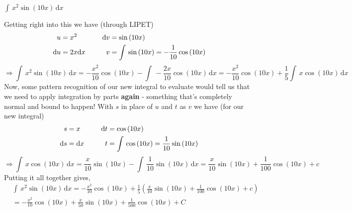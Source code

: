 \documentclass[addpoints]{exam}
\theoremstyle{definition}
\theoremstyle{plain}
\begin{document}
\begin{questions}
    \ifprintanswers
    \else
        \newpage
    \fi

    \question $\displaystyle \int\,x^{2}\sin\left(10x\right)\,\mathrm{d}x$
    \begin{solution}[\stretch{1}]
        Getting right into this we have (through LIPET)
        \begin{align*}
            u &= x^2 &\hspace{0.2in} \mathrm{d}v &= \sin\left(10x\right) \\
            \mathrm{d}u &= 2x\mathrm{d}x &\hspace{0.2in} v &= \int\,\sin\left(10x\right) = -\frac{1}{10}\cos\left(10x\right)
        \end{align*}
        \[
            \Rightarrow \int\,x^2\sin\left(10x\right)\,\mathrm{d}x = -\frac{x^2}{10}\cos\left(10x\right) - \int\,-\frac{2x}{10}\cos\left(10x\right)\,\mathrm{d}x = -\frac{x^2}{10}\cos\left(10x\right) + \frac{1}{5}\int\,x\cos\left(10x\right)\,\mathrm{d}x
        \]
        Now, some pattern recognition of our new integral to evaluate would tell us that we need to apply integration by parts \textbf{again} - something that's completely normal and bound to happen! With $s$ in place of $u$ and $t$ as $v$ we have (for our new integral)
        \begin{align*}
            s &= x &\hspace{0.2in} \mathrm{d}t &= \cos\left(10x\right) \\
            \mathrm{d}s &= \mathrm{d}x &\hspace{0.2in} t &= \int\,\cos\left(10x\right) = \frac{1}{10}\sin\left(10x\right)
        \end{align*}
        \[
            \Rightarrow \int\,x\cos\left(10x\right)\,\mathrm{d}x = \frac{x}{10}\sin\left(10x\right) - \int\,\frac{1}{10}\sin\left(10x\right)\,\mathrm{d}x = \frac{x}{10}\sin\left(10x\right) + \frac{1}{100}\cos\left(10x\right) + c
        \]
        Putting it all together gives,
        \begin{align*}
        &\int\,x^{2}\sin\left(10x\right)\,\mathrm{d}x = -\frac{x^2}{10}\cos\left(10x\right) + \frac{1}{5}\left(\frac{x}{10}\sin\left(10x\right) + \frac{1}{100}\cos\left(10x\right) + c\right) \\ &= \boxed{-\frac{x^2}{10}\cos\left(10x\right) + \frac{x}{50}\sin\left(10x\right) + \frac{1}{500}\cos\left(10x\right) + C}
        \end{align*}
    \end{solution}
\end{questions}
\end{document}
